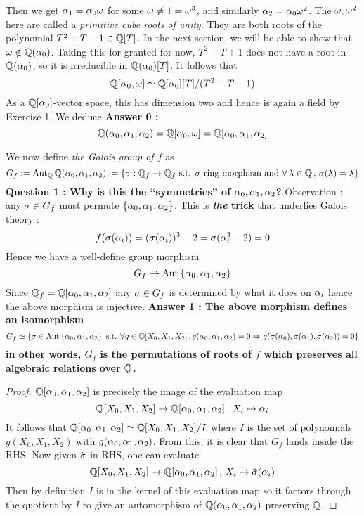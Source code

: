 \documentclass{article}
\begin{document}
Then we get $\alpha_1 = \alpha_0 \omega$ for some $\omega \neq 1 = \omega^3$,
and similarly $\alpha_2 = \alpha_0 \omega^2$.
The $\omega, \omega^2$ here are called a \emph{primitive cube roots of unity}.
They are both roots of the polynomial $T^2 + T + 1 \in \mathbb{Q}[T]$.
In the next section, we will be able to show that $\omega \notin \mathbb{Q}(\alpha_0)$.
Taking this for granted for now,
$T^2 + T + 1$ does not have a root in $\mathbb{Q}(\alpha_0)$,
so it is irreducible in $\mathbb{Q}(\alpha_0)[T]$.
It follows that \[
  \mathbb{Q}[\alpha_0 , \omega] \simeq \mathbb{Q}[\alpha_0][T] / (T^2 + T + 1)
\]
As a $\mathbb{Q}[\alpha_0]$-vector space, this has dimension two and
hence is again a field by Exercise 1. 
We deduce 
\textbf{Answer 0 :} \[
  \mathbb{Q}(\alpha_0 , \alpha_1 , \alpha_2) = \mathbb{Q}[\alpha_0 , \omega] = \mathbb{Q}[\alpha_0 , \alpha_1 ,\alpha_2]
\]

We now define \emph{the Galois group of $f$} as \[
  G_f := \operatorname{Aut}_{\mathbb{Q}} \mathbb{Q}(\alpha_0 , \alpha_1 , \alpha_2)
  := \left\{\sigma : \mathbb{Q}_f \to \mathbb{Q}_f \text{ s.t. } \sigma \text{ ring morphism and }
  \forall\,\lambda \in \mathbb{Q}\,,\,\sigma(\lambda) = \lambda\right\}
\]
\textbf{Question 1 : Why is this the ``symmetries'' of $\alpha_0 , \alpha_1 ,\alpha_2$?}
Observation : any $\sigma \in G_f$ must permute $\left\{\alpha_0 , \alpha_1 , \alpha_2\right\}$.
This is \textbf{\emph{the} trick} that underlies Galois theory : \[
  f(\sigma(\alpha_i)) = (\sigma(\alpha_i))^3 - 2 = \sigma(\alpha_i^3 - 2) = 0
\]
Hence we have a well-define group morphism \[
  G_f \to \operatorname{Aut}\left\{\alpha_0 , \alpha_1 , \alpha_2\right\}
\]
Since $\mathbb{Q}_f = \mathbb{Q}[\alpha_0 , \alpha_1 ,\alpha_2]$ any $\sigma \in G_f$
is determined by what it does on $\alpha_i$ hence the above morphism is injective.
\textbf{Answer 1 : The above morphism defines an isomorphism}
\[
  G_f \simeq \left\{
    \sigma \in \operatorname{Aut}\left\{\alpha_0 ,\alpha_1 ,\alpha_2\right\} \text{ s.t. } 
    \forall g \in \mathbb{Q}[X_0 , X_1 , X_2] \,,
    g(\alpha_0 , \alpha_1 ,\alpha_2) = 0 \Rightarrow
    g(\sigma(\alpha_0) , \sigma(\alpha_1) , \sigma(\alpha_2)) = 0
  \right\}
\]
\textbf{in other words, $G_f$ is the permutations of roots of $f$
which preserves all algebraic relations over $\mathbb{Q}$.}
\begin{proof}
  $\mathbb{Q}[\alpha_0 , \alpha_1 , \alpha_2]$ is precisely the image of 
  the evaluation map \[
    \mathbb{Q}[X_0 , X_1 , X_2] \to \mathbb{Q}[\alpha_0 , \alpha_1 , \alpha_2] \,,\,X_i \mapsto \alpha_i
  \]
  It follows that $
    \mathbb{Q}[\alpha_0 , \alpha_1 , \alpha_2] \simeq 
    \mathbb{Q}[X_0 , X_1 , X_2] / I
  $ where $I$ is the set of polynomials $g(X_0 , X_1 , X_2)$ with
  $g(\alpha_0 , \alpha_1 , \alpha_2)$.
  From this, it is clear that $G_f$ lands inside the RHS.
  Now given $\tilde{\sigma}$ in RHS,
  one can evaluate \[
    \mathbb{Q}[X_0 , X_1 , X_2] \to \mathbb{Q}[\alpha_0 , \alpha_1 ,\alpha_2] \,,\, 
    X_i \mapsto \tilde{\sigma}(\alpha_i)
  \]
  Then by definition $I$ is in the kernel of this evaluation map
  so it factors through the quotient by $I$ to give
  an automorphism of $\mathbb{Q}(\alpha_0 , \alpha_1 , \alpha_2)$ preserving $\mathbb{Q}$.
\end{proof}
\end{document}
